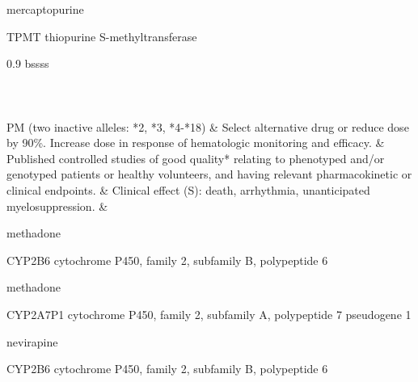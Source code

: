 \documentclass{resume} %
\begin{document}
\begin{rSection}{ mercaptopurine }
\begin{rSubsection}{ TPMT }{ thiopurine S-methyltransferase }{}{}
\begin{center}
\begin{tabularx}{0.9\textwidth}{ bssss }
\\
		\vspace{1pt}\\
		\hline \\
		\vspace{1pt}\\
		         PM (two inactive alleles: *2, *3, *4-*18) & Select alternative drug or reduce dose by 90\%. Increase dose in response of hematologic monitoring and efficacy. & Published controlled studies of good quality* relating to phenotyped and/or genotyped patients or healthy volunteers, and having relevant pharmacokinetic or clinical endpoints. & Clinical effect (S): death,  arrhythmia,  unanticipated myelosuppression. &
\\
		\end{tabularx}
		\end{center}
		\normalsize
		\vspace{10pt}
		        


\end{rSubsection}

\end{rSection}\begin{rSection}{ methadone }
\item[]
\begin{rSubsection}{ CYP2B6 }{ cytochrome P450, family 2, subfamily B, polypeptide 6 }{}{}
\item[]


\end{rSubsection}

\end{rSection}\begin{rSection}{ methadone }
\item[]
\begin{rSubsection}{ CYP2A7P1 }{ cytochrome P450, family 2, subfamily A, polypeptide 7 pseudogene 1 }{}{}
\item[]


\end{rSubsection}

\end{rSection}\begin{rSection}{ nevirapine }
\item[]
\begin{rSubsection}{ CYP2B6 }{ cytochrome P450, family 2, subfamily B, polypeptide 6 }{}{}
\item[]


\end{rSubsection}


\end{rSection}
\end{document}
